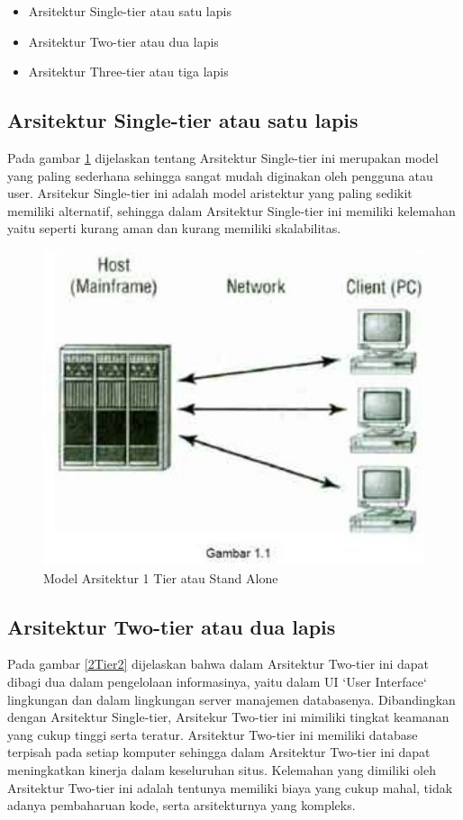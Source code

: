 {	\begin{itemize}
	\item Arsitektur Single-tier atau satu lapis
	\item Arsitektur Two-tier atau dua lapis
	\item Arsitektur Three-tier atau tiga lapis
	\end{itemize}

\subsection{Arsitektur Single-tier atau satu lapis}
Pada gambar \ref{1Stand} dijelaskan tentang Arsitektur Single-tier ini merupakan model yang paling sederhana sehingga sangat mudah diginakan oleh pengguna atau user.
Arsitekur Single-tier ini adalah model aristektur yang paling sedikit memiliki alternatif, sehingga dalam Arsitektur Single-tier ini
memiliki kelemahan yaitu seperti kurang aman dan kurang memiliki skalabilitas.

\begin{figure}[ht]
    \centerline{\includegraphics[width=1\textwidth]{figures/2modelstandalone.jpg}}
    \caption{Model Arsitektur 1 Tier atau Stand Alone}
    \label{1Stand}
\end{figure}

\subsection{Arsitektur Two-tier atau dua lapis}
Pada gambar \ref{2Tier2} dijelaskan bahwa dalam Arsitektur Two-tier ini dapat dibagi dua dalam pengelolaan informasinya, yaitu dalam UI `User Interface` lingkungan dan dalam
lingkungan server manajemen databasenya. Dibandingkan dengan Arsitektur Single-tier, Arsitekur Two-tier ini mimiliki tingkat
keamanan yang cukup tinggi serta teratur. Arsitektur Two-tier ini memiliki database terpisah pada setiap komputer sehingga dalam
Arsitektur Two-tier ini dapat meningkatkan kinerja dalam keseluruhan situs. Kelemahan yang dimiliki oleh Arsitektur Two-tier ini
adalah tentunya memiliki biaya yang cukup mahal, tidak adanya pembaharuan kode, serta arsitekturnya yang kompleks.

}
